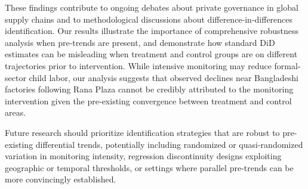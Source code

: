 These findings contribute to ongoing debates about private governance in global supply chains and to methodological discussions about difference-in-differences identification. Our results illustrate the importance of comprehensive robustness analysis when pre-trends are present, and demonstrate how standard DiD estimates can be misleading when treatment and control groups are on different trajectories prior to intervention. While intensive monitoring may reduce formal-sector child labor, our analysis suggests that observed declines near Bangladeshi factories following Rana Plaza cannot be credibly attributed to the monitoring intervention given the pre-existing convergence between treatment and control areas.

Future research should prioritize identification strategies that are robust to pre-existing differential trends, potentially including randomized or quasi-randomized variation in monitoring intensity, regression discontinuity designs exploiting geographic or temporal thresholds, or settings where parallel pre-trends can be more convincingly established.


%
